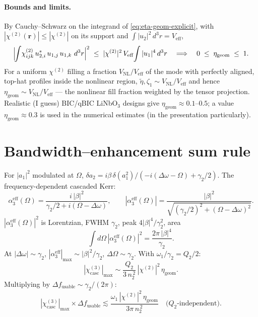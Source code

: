 \documentclass[11pt,a4paper]{article}
\newcommand{\bvec}[1]{\mathbf{#1}}
\newcommand{\ri}{\bvec{r}}
\newcommand{\dthreer}{\,d^{3}r}
\newcommand{\chitwo}{\chi^{(2)}}
\newcommand{\chithree}{\chi^{(3)}}
\newcommand{\Dom}{\Delta\omega}
\begin{document}
\paragraph{Bounds and limits.} By Cauchy--Schwarz on the integrand of
\eqref{eq:eta-geom-explicit}, with $|\chitwo(\ri)|\!\leq\!|\chitwo|$ on its
support and $\int|u_2|^{2}\dthreer=V_\text{eff}$,
\[
  \Bigl|\!\int\!\chitwo_{ijk}\,u_{2,i}^{*}\,u_{1,j}\,u_{1,k}\,\dthreer\Bigr|^{2}
  \;\leq\;
  |\chitwo|^{2}\,V_\text{eff}\!\int|u_{1}|^{4}\dthreer
  \quad\Longrightarrow\quad
  0\;\leq\;\eta_\text{geom}\;\leq\;1.
\]
For a uniform $\chitwo$ filling a fraction $V_\text{NL}/V_\text{eff}$ of the
mode with perfectly aligned, top-hat profiles inside the nonlinear region,
$\widetilde\eta,\zeta_1\sim V_\text{NL}/V_\text{eff}$ and hence
$\eta_\text{geom}\sim V_\text{NL}/V_\text{eff}$ — the nonlinear fill
fraction weighted by the tensor projection. Realistic (I guess) BIC/qBIC LiNbO$_3$
designs give $\eta_\text{geom}\approx 0.1\text{--}0.5$; a value
$\eta_\text{geom}\!\approx\!0.3$ is used in the numerical
estimates (in the presentation particularly).

\section{Bandwidth--enhancement sum rule}\label{sec:sumrule}

For $|a_1|^2$ modulated at $\Omega$, $\delta a_2=i\beta\,\delta(a_1^2)/(-i(\Dom-\Omega)+\gamma_2/2)$. The frequency-dependent cascaded Kerr:
\begin{equation}
  \alpha_3^{\text{eff}}(\Omega)=\frac{i\,|\beta|^{2}}{\gamma_2/2+i(\Omega-\Dom)},
  \qquad
  |\alpha_3^{\text{eff}}(\Omega)|=\frac{|\beta|^{2}}{\sqrt{(\gamma_2/2)^{2}+(\Omega-\Dom)^{2}}}.
  \label{eq:alpha3-AC}
\end{equation}
$|\alpha_3^\text{eff}(\Omega)|^2$ is Lorentzian, FWHM $\gamma_2$, peak $4|\beta|^4/\gamma_2^2$, area
\begin{equation}
  \int\!d\Omega\,|\alpha_3^{\text{eff}}(\Omega)|^{2}=\frac{2\pi\,|\beta|^{4}}{\gamma_2}.
\end{equation}
At $|\Dom|\sim\gamma_2$, $|\alpha_3^\text{eff}|_\text{max}\sim|\beta|^2/\gamma_2$, $\Delta\Omega\sim\gamma_2$. With $\omega_1/\gamma_2=Q_2/2$:
\begin{equation}
  |\chithree_\text{casc}|_\text{max}\sim
       \frac{Q_2}{3\,n_2^{\,2}}\,|\chitwo|^2\,\eta_\text{geom}.
  \label{eq:chi3-max}
\end{equation}
Multiplying by $\Delta f_\text{usable}\sim\gamma_2/(2\pi)$:
\begin{equation}
  \boxed{\;|\chithree_\text{casc}|_\text{max}\times\Delta f_\text{usable}
          \lesssim\frac{\omega_1\,|\chitwo|^2\,\eta_\text{geom}}{3\pi\,n_2^{\,2}}
          \quad\text{($Q_2$-independent)}.\;}
  \label{eq:sum-rule}
\end{equation}
\end{document}
